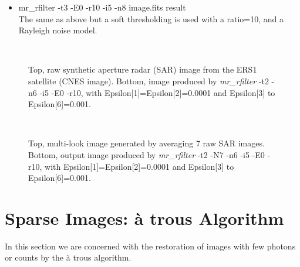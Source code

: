 \begin{itemize}
\begin{itemize}
\item mr\_rfilter -t3 -E0 -r10 -i5 -n8  image.fits result\\
The same as above but a soft thresholding is used with a ratio=10, and a Rayleigh noise model.

\end{itemize}


\begin{figure}[htb]
\centerline{
\vbox{
\hbox{
}
\hbox{
}}}
\caption{{\small Top, raw synthetic aperture radar (SAR) image from the
ERS1 satellite  (CNES image).  
Bottom, image produced by {\it mr\_rfilter} -t2 -n6 -i5 -E0 -r10, 
with Epsilon[1]=Epsilon[2]=0.0001 and Epsilon[3] to Epsilon[6]=0.001.}}
\label{fig:im1}
\end{figure}

\begin{figure}[htb]
\centerline{
\vbox{
\hbox{
}
\hbox{
}}}
\caption{Top, multi-look image generated by averaging 7 raw SAR images. Bottom,  output image produced by {\em mr\_rfilter} -t2 -N7 -n6 -i5 -E0 -r10, with Epsilon[1]=Epsilon[2]=0.0001 and Epsilon[3] to Epsilon[6]=0.001.}
\label{fig:im1f}
\end{figure}

\clearpage
\newpage


\section{Sparse Images: \`a trous Algorithm}

In this section we are concerned with the 
restoration of images with few photons or counts by the \`a trous algorithm.



\end{itemize}

